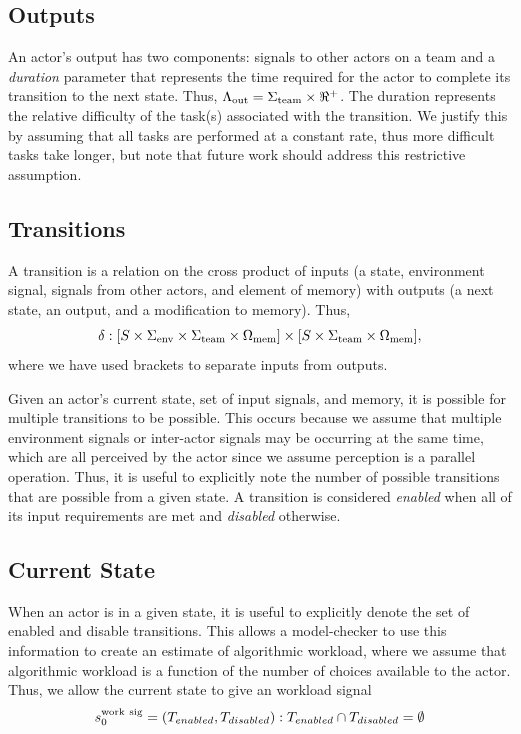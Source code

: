  \subsection{Outputs}
 An actor's output has two components: signals to other actors on a team and a {\em duration} parameter that represents the time required for the actor to complete its transition to the next state.  Thus, $\Lambda_{\rm out}=\Sigma_{\rm team} \times \Re^+$. The duration represents the relative difficulty of the
task(s) associated with the transition.  We justify this by assuming that
all tasks are performed at a constant rate, thus more difficult tasks take
longer, but note that future work should address this restrictive assumption.  
 
 \subsection{Transitions}
 
A transition is a relation on the cross product of inputs (a state, environment signal, signals from other actors, and element of memory)  with outputs (a next state, an output, and a modification to memory).  Thus,
\begin{equation}
 \delta:[S\times\Sigma_{\rm env}\times\Sigma_{\rm team}\times\Omega_{\rm mem}] \times [S\times \Sigma_{\rm team} \times \Omega_{\rm mem}], 
\end{equation} 
where we have used brackets to separate inputs from outputs.
 
Given an actor's current state, set of input signals, and memory, it is possible for multiple transitions to be possible.  This occurs because we assume that multiple environment signals or inter-actor signals may be occurring at the same time, which are all perceived by the actor since we assume perception is a parallel operation.  Thus, it is useful to explicitly note the number of possible transitions that are possible from a given state.   A transition is considered {\em enabled} when all of its input
requirements are met and {\em disabled} otherwise. 

\subsection{Current State}
When an actor is in a given state, it is useful to explicitly denote the set of enabled and disable transitions.  This allows a model-checker to use this information to create an estimate of algorithmic workload, where we assume that algorithmic workload is a function of the number of choices available to the actor.  Thus, we allow the current state to give an workload signal
 \begin{equation}
	s_0^{\rm work\  sig} = (T_{enabled}, T_{disabled}) : T_{enabled} \cap T_{disabled} = \emptyset
 \label{eq:state}
\end{equation}


